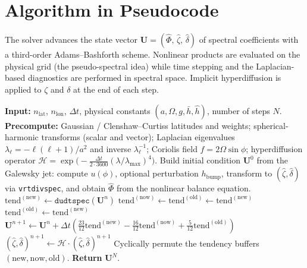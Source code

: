 \documentclass[11pt]{article}
\newcommand{\bvec}[1]{\boldsymbol{#1}}
\begin{document}
\section{Algorithm in Pseudocode}

The solver advances the state vector
$\bvec{U} = (\hat\Phi,\,\hat\zeta,\,\hat\delta)$ of spectral
coefficients with a third-order Adams--Bashforth scheme.  Nonlinear
products are evaluated on the physical grid (the pseudo-spectral idea)
while time stepping and the Laplacian-based diagnostics are performed in
spectral space.  Implicit hyperdiffusion is applied to $\zeta$ and
$\delta$ at the end of each step.

\begin{algorithm}[H]
\caption{Pseudo-spectral integration of the shallow-water equations.}
\begin{algorithmic}[1]
\State \textbf{Input:} $n_{\mathrm{lat}}$, $n_{\mathrm{lon}}$, $\Delta t$,
       physical constants $(a,\Omega,g,\bar h,\hat h)$,
       number of steps $N$.
\State \textbf{Precompute:}
        Gaussian / Clenshaw--Curtiss latitudes and weights;
        spherical-harmonic transforms (scalar and vector);
        Laplacian eigenvalues $\lambda_\ell = -\ell(\ell+1)/a^{2}$
        and inverse $\lambda_\ell^{-1}$;
        Coriolis field $f = 2\Omega\sin\phi$;
        hyperdiffusion operator
        $\mathcal{H} = \exp\!\bigl(-\tfrac{\Delta t}{2\cdot 3600}
        (\lambda/\lambda_{\max})^{4}\bigr)$.
\State Build initial condition $\bvec{U}^{0}$ from the Galewsky jet:
       compute $u(\phi)$, optional perturbation $h_{\text{bump}}$,
       transform to $(\hat\zeta,\hat\delta)$ via \texttt{vrtdivspec},
       and obtain $\hat\Phi$ from the nonlinear balance equation.
    \State $\mathrm{tend}^{(\mathrm{new})} \gets \texttt{dudtspec}(\bvec{U}^{n})$
        $\mathrm{tend}^{(\mathrm{now})}\gets\mathrm{tend}^{(\mathrm{old})}\gets\mathrm{tend}^{(\mathrm{new})}$
        $\mathrm{tend}^{(\mathrm{old})}\gets\mathrm{tend}^{(\mathrm{new})}$
    \EndIf
    \State $\bvec{U}^{n+1} \gets \bvec{U}^{n} + \Delta t\!\left(
            \frac{23}{12}\mathrm{tend}^{(\mathrm{new})}
            - \frac{16}{12}\mathrm{tend}^{(\mathrm{now})}
            + \frac{5}{12}\mathrm{tend}^{(\mathrm{old})}\right)$
    \State $(\hat\zeta,\hat\delta)^{n+1} \gets
            \mathcal{H}\cdot(\hat\zeta,\hat\delta)^{n+1}$
    \State Cyclically permute the tendency buffers
           $(\mathrm{new},\mathrm{now},\mathrm{old})$.
\EndFor
\State \textbf{Return} $\bvec{U}^{N}$.
\end{algorithmic}
\end{algorithm}
\end{document}
